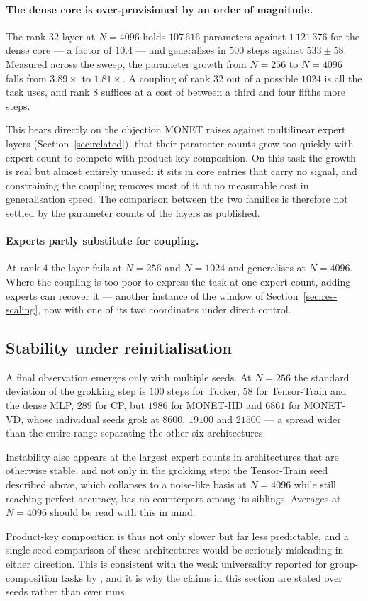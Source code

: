 \paragraph{The dense core is over-provisioned by an order of magnitude.} The
rank-$32$ layer at $N = 4096$ holds $107\,616$ parameters against $1\,121\,376$
for the dense core --- a factor of $10.4$ --- and generalises in $500$ steps
against $533 \pm 58$. Measured across the sweep, the parameter growth from
$N = 256$ to $N = 4096$ falls from $3.89\times$ to $1.81\times$. A coupling of rank $32$ out of a possible $1024$ is all the task uses, and rank
$8$ suffices at a cost of between a third and four fifths more steps.

This bears directly on the objection MONET raises against multilinear expert
layers (Section~\ref{sec:related}), that their parameter counts grow too
quickly with expert count to compete with product-key composition. On this
task the growth is real but almost entirely unused: it sits in core entries
that carry no signal, and constraining the coupling removes most of it at no
measurable cost in generalisation speed. The comparison between the two
families is therefore not settled by the parameter counts of the layers as
published.

\paragraph{Experts partly substitute for coupling.} At rank $4$ the layer
fails at $N = 256$ and $N = 1024$ and generalises at $N = 4096$. Where the
coupling is too poor to express the task at one expert count, adding experts
can recover it --- another instance of the window of Section~\ref{sec:res-scaling},
now with one of its two coordinates under direct control.

\subsection{Stability under reinitialisation}
\label{sec:res-stability}

A final observation emerges only with multiple seeds. At $N = 256$ the standard
deviation of the grokking step is $100$ steps for Tucker, $58$ for
Tensor-Train and the dense MLP, $289$ for CP, but $1986$ for MONET-HD and
$6861$ for MONET-VD, whose individual seeds grok at $8600$, $19100$ and
$21500$ --- a spread wider than the entire range separating the other six
architectures.

Instability also appears at the largest expert counts in architectures that are
otherwise stable, and not only in the grokking step: the Tensor-Train seed
described above, which collapses to a noise-like basis at $N = 4096$ while
still reaching perfect accuracy, has no counterpart among its siblings.
Averages at $N = 4096$ should be read with this in mind.

Product-key composition is thus not only slower but far less predictable, and a
single-seed comparison of these architectures would be seriously misleading in
either direction. This is consistent with the weak universality reported for
group-composition tasks by \citet{chughtai2023universality}, and it is why the
claims in this section are stated over seeds rather than over runs.